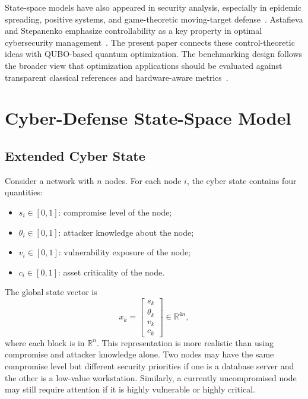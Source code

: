 \documentclass[runningheads]{llncs}
\begin{document}
State-space models have also appeared in security analysis, especially in epidemic spreading, positive systems, and game-theoretic moving-target defense~\cite{khanafer2016stability,zhu2013game}. Astafieva and Stepanenko emphasize controllability as a key property in optimal cybersecurity management~\cite{astafieva2025optimal}. The present paper connects these control-theoretic ideas with QUBO-based quantum optimization. The benchmarking design follows the broader view that optimization applications should be evaluated against transparent classical references and hardware-aware metrics~\cite{lubinski2024optimization}.

\section{Cyber-Defense State-Space Model}

\subsection{Extended Cyber State}

Consider a network with $n$ nodes. For each node $i$, the cyber state contains four quantities:
\begin{itemize}
    \item $s_i \in [0,1]$: compromise level of the node;
    \item $\theta_i \in [0,1]$: attacker knowledge about the node;
    \item $v_i \in [0,1]$: vulnerability exposure of the node;
    \item $c_i \in [0,1]$: asset criticality of the node.
\end{itemize}

The global state vector is
\begin{equation}
x_k =
\begin{bmatrix}
s_k\\
\theta_k\\
v_k\\
c_k
\end{bmatrix}
\in \mathbb{R}^{4n},
\end{equation}
where each block is in $\mathbb{R}^{n}$. This representation is more realistic than using compromise and attacker knowledge alone. Two nodes may have the same compromise level but different security priorities if one is a database server and the other is a low-value workstation. Similarly, a currently uncompromised node may still require attention if it is highly vulnerable or highly critical.
\end{document}
